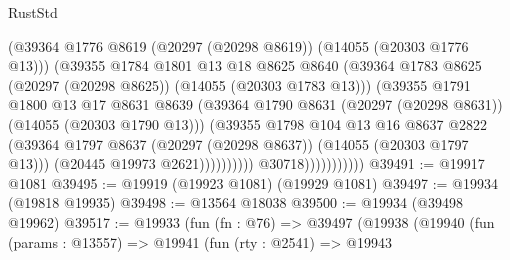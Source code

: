 \begin{lexlean}{RustStd}
\begin{coremodule}
                                      (@39364
                                        @1776
                                        @8619
                                        (@20297 (@20298 @8619))
                                        (@14055 (@20303 @1776 @13)))
                                      (@39355
                                        @1784
                                        @1801
                                        @13
                                        @18
                                        @8625
                                        @8640
                                        (@39364
                                          @1783
                                          @8625
                                          (@20297 (@20298 @8625))
                                          (@14055 (@20303 @1783 @13)))
                                        (@39355
                                          @1791
                                          @1800
                                          @13
                                          @17
                                          @8631
                                          @8639
                                          (@39364
                                            @1790
                                            @8631
                                            (@20297 (@20298 @8631))
                                            (@14055 (@20303 @1790 @13)))
                                          (@39355
                                            @1798
                                            @104
                                            @13
                                            @16
                                            @8637
                                            @2822
                                            (@39364
                                              @1797
                                              @8637
                                              (@20297 (@20298 @8637))
                                              (@14055 (@20303 @1797 @13)))
                                            (@20445 @19973 @2621))))))))))
                          @30718)))))))))))
@39491 := @19917 @1081
@39495 := @19919 (@19923 @1081) (@19929 @1081)
@39497 := @19934 (@19818 @19935)
@39498 := @13564 @18038
@39500 := @19934 (@39498 @19962)
@39517 := @19933
    (fun (fn : @76) =>
    @39497
      (@19938
        (@19940
          (fun (params : @13557) =>
          @19941
            (fun (rty : @2541) =>
            @19943

\end{coremodule}
\end{lexlean}
